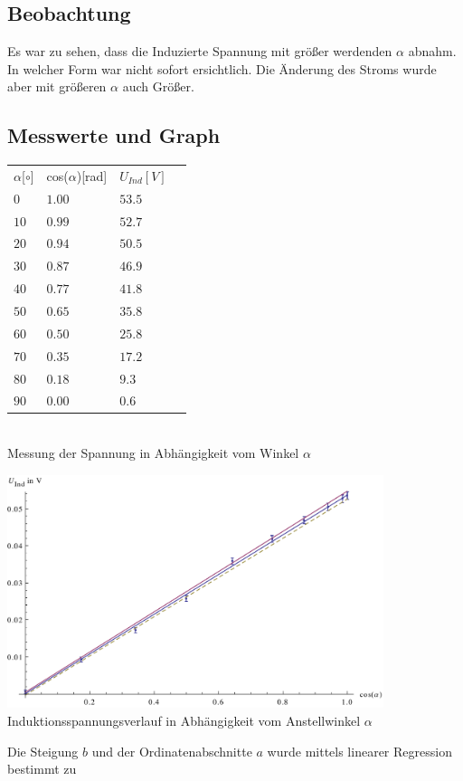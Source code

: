 \documentclass{article}
\begin{document}
\subsection{Beobachtung}
Es war zu sehen, dass die Induzierte Spannung mit größer werdenden \( \alpha \) abnahm. In welcher Form war nicht sofort ersichtlich. Die Änderung des Stroms wurde aber mit größeren \( \alpha \) auch Größer. 
\subsection{Messwerte und Graph}

\begin{center}


\begin{tabular}{l l l l}
\(\alpha\)[\(\circ\)] & cos(\(\alpha\))[rad] & \(U_{Ind}[V]\) \\
\(0\) &	\(1.00\) &	\(53.5\) \\
\(10\) &	\(0.99\) &	\(52.7\) \\
\(20\) &	\(0.94\) &	\(50.5\) \\
\(30\) &	\(0.87\) &	\(46.9\) \\
\(40\) &	\(0.77\) &	\(41.8\) \\
\(50\) &	\(0.65\) &	\(35.8\) \\
\(60\) &	\(0.50\) &	\(25.8\) \\
\(70\) &	\(0.35\) &	\(17.2\) \\
\(80\) &	\(0.18\) &	\(9.3\) \\
\(90\) &	\(0.00\) &	\(0.6\) \\

\end{tabular}\\
Messung der Spannung in Abhängigkeit vom Winkel \(\alpha\)\\
\end{center}

\begin{center}
  \includegraphics[width=11cm]{graph4}
	Induktionsspannungsverlauf in Abhängigkeit vom Anstellwinkel \( \alpha \)
\end{center}
Die Steigung \(b\) und der Ordinatenabschnitte \(a\) wurde mittels linearer Regression bestimmt zu
\end{document}
